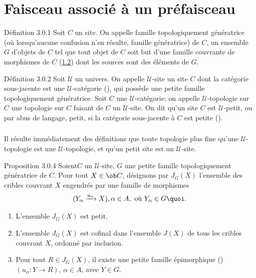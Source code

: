 \section{Faisceau associé à un préfaisceau}

\begin{enonce*}{Définition 3.0.1}
Soit $C$ un site. On appelle famille topologiquement génératrice
(où lorsqu'aucune confusion n'en résulte, famille
génératrice) de $C$, un ensemble $G$ d'objets de $C$ tel que
tout objet de $C$ soit but d'une famille couvrante de morphismes de
$C$ (\hyperref[II.def1.2]{1.2}) dont les sources sont des éléments de $G$.
\end{enonce*}

\begin{enonce*}{Définition 3.0.2}
Soit $𝒰$ un univers. On appelle $𝒰$-site un site $C$
dont la catégorie sous-jacente est une $𝒰$-catégorie
{\rm()}, qui possède une petite famille
topologiquement génératrice. Soit $C$ une
$𝒰$-catégorie; on appelle $𝒰$-topologie sur $C$
une topologie sur $C$ faisant de $C$ un $𝒰$-site. On dit
qu'un site $C$ est $𝒰$-petit, ou par abus de langage, petit,
si la catégorie sous-jacente à $C$ est petite
{\rm()}.
\end{enonce*}

\setcounter{subsubsection}{2}
\subsubsection{}
Il résulte immédiatement des définitions que toute topologie
plus fine qu'une $𝒰$-topologie est une
$𝒰$-topologie, et qu'un petit site est un $𝒰$-site.

\begin{enonce*}{Proposition 3.0.4}
Soient\pageoriginale $C$ un $𝒰$-site, $G$ une petite famille
topologiquement génératrice de $C$. Pour tout $X\in \ob C$,
désignons par $J_G(X)$ l'ensemble des cribles couvrant $X$
engendrés par une famille de morphismes
$$
(Y_{\alpha}\xrightarrow{u_{\alpha}} X), \alpha\in A, \mbox{ où }
Y_{\alpha} \in G{\quoi}.
$$
\begin{enumerate}
\renewcommand{\labelenumi}{\theenumi)}
\item L'ensemble $J_G(X)$ est petit.

\item L'ensemble $J_G(X)$ est cofinal dans l'ensemble $J(X)$ de tous
  les cribles couvrant $X$, ordonné par inclusion.

\item Pour tout $R\in J_G(X)$, il existe une petite famille
  épimorphique {\rm()} $(u_{\alpha}:Y\rightarrow R)$, $\alpha
  \in A$, avec $Y\in G$.
\end{enumerate}
\end{enonce*}

